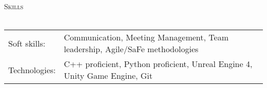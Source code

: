 \documentclass[a4paper]{article}
\newcommand{\lineunder} {
    \vspace*{-8pt} \\
    \hspace*{-18pt} \hrulefill \\
}
\newcommand{\header} [1] {
    {\hspace*{-18pt}\vspace*{6pt} \textsc{#1}}
    \vspace*{-6pt} \lineunder
}
\begin{document}
\header{Skills}
\begin{tabular}{ l l }
	Soft skills:  & Communication, Meeting Management, Team leadership, Agile/SaFe methodologies \\
	Technologies: & C++ proficient, Python proficient, Unreal Engine 4, Unity Game Engine, Git   \\
\end{tabular}
\vspace{2mm}





\ 
\end{document}
